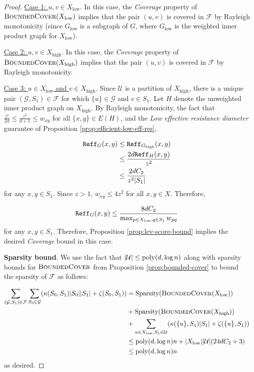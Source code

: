\begin{proof}
\underline{Case 1: $u,v\in X_{\text{low}}$}. In this case, the \emph{Coverage} property of $\textsc{BoundedCover}(X_{\text{low}})$ implies that the pair $(u,v)$ is covered in $\mathcal F$ by Rayleigh monotonicity (since $G_{\text{low}}$ is a subgraph of $G$, where $G_{\text{low}}$ is the weighted inner product graph for $X_{\text{low}}$).

\underline{Case 2: $u,v\in X_{\text{high}}$}. In this case, the \emph{Coverage} property of $\textsc{BoundedCover}(X_{\text{high}})$ implies that the pair $(u,v)$ is covered in $\mathcal F$ by Rayleigh monotonicity.

\underline{Case 3: $u\in X_{\text{low}}$ and $v\in X_{\text{high}}$}. Since $\mathcal U$ is a partition of $X_{\text{high}}$, there is a unique pair $(\mathcal G,S_1)\in \mathcal F$ for which $\{u\}\in \mathcal G$ and $v\in S_1$. Let $H$ denote the unweighted inner product graph on $X_{\text{high}}$. By Rayleigh monotonicity, the fact that $\frac{z^2}{2d}\le\frac{z^2}{d+1}\le w_{xy}$ for all $\{x,y\}\in E(H)$, and the \emph{Low effective resistance diameter} guarantee of Proposition \ref{prop:efficient-low-eff-res},

\begin{align*}
    \mathtt{Reff}_G(x,y) &\le \mathtt{Reff}_{G_{\text{high}}}(x,y)\\
    &\le \frac{2d\mathtt{Reff}_H(x,y)}{z^2}\\
    &\le \frac{2dC_2}{z^2|S_1|}\\
\end{align*}
for any $x,y\in S_1$. Since $z > 1$, $w_{xy}\le 4z^2$ for all $x,y\in X$. Therefore,

$$\mathtt{Reff}_G(x,y) \le \frac{8dC_2}{\max_{p\in X_{\text{low}}, q\in S_1} w_{pq}}$$
for any $x,y\in S_1$. Therefore, Proposition \ref{prop:lev-score-bound} implies the desired \emph{Coverage} bound in this case.

\textbf{Sparsity bound}. We use the fact that $|\mathcal U|\le \mathrm{poly}(d,\log n)$ along with sparsity bounds for $\textsc{BoundedCover}$ from Proposition \ref{prop:bounded-cover} to bound the sparsity of $\mathcal F$ as follows:

\begin{align*}
    \sum_{(\mathcal G, S_1)\in \mathcal F} \sum_{S_0\in \mathcal G} (\kappa(S_0,S_1) |S_0||S_1| + \zeta(S_0,S_1)) &= \text{Sparsity}(\textsc{BoundedCover}(X_{\text{low}})) \\
    &+ \text{Sparsity}(\textsc{BoundedCover}(X_{\text{high}})) \\
    &+ \sum_{u\in X_{\text{low}}, S_1\in \mathcal U} (\kappa(\{u\},S_1)|S_1| + \zeta(\{u\},S_1))\\
    &\le \mathrm{poly}(d,\log n) n + |X_{\text{low}}||\mathcal U| (24dC_2 + 3)\\
    &\le \mathrm{poly}(d,\log n) n\\
\end{align*}
as desired.


\end{proof}
